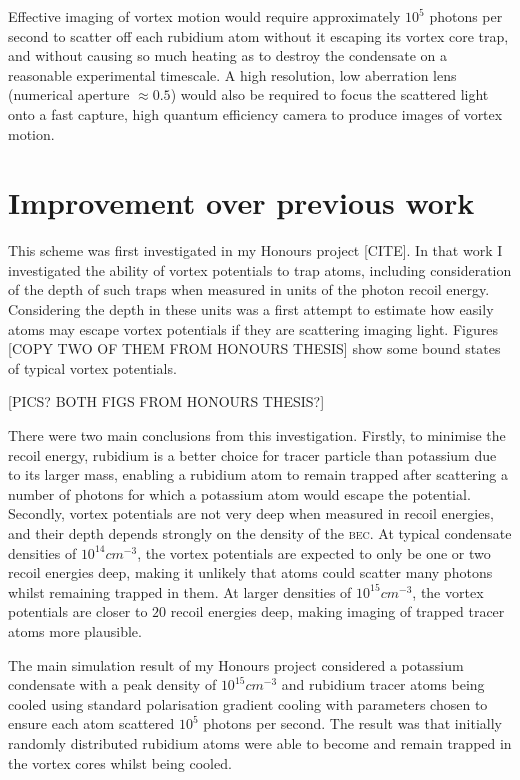 Effective imaging of vortex motion would require approximately $10^5$ photons per second to scatter off each rubidium atom without it escaping its vortex core trap, and without causing so much heating as to destroy the condensate on a reasonable experimental timescale. A high resolution, low aberration lens (numerical aperture $\approx 0.5$) would also be required to focus the scattered light onto a fast capture, high quantum efficiency camera to produce images of vortex motion.


\section{Improvement over previous work}

This scheme was first investigated in my Honours project [CITE]. In that work I investigated the ability of vortex potentials to trap atoms, including consideration of the depth of such traps when measured in units of the photon recoil energy. Considering the depth in these units was a first attempt to estimate how easily atoms may escape vortex potentials if they are scattering imaging light. Figures [COPY TWO OF THEM FROM HONOURS THESIS] show some bound states of typical vortex potentials.

[PICS? BOTH FIGS FROM HONOURS THESIS?]

There were two main conclusions from this investigation. Firstly, to minimise the recoil energy, rubidium is a better choice for tracer particle than potassium due to its larger mass, enabling a rubidium atom to remain trapped after scattering a number of photons for which a potassium atom would escape the potential. Secondly, vortex potentials are not very deep when measured in recoil energies, and their depth depends strongly on the density of the \textsc{bec}. At typical condensate densities of $10^{14}\unit{cm}^{-3}$, the vortex potentials are expected to only be one or two recoil energies deep, making it unlikely that atoms could scatter many photons whilst remaining trapped in them. At larger densities of $10^{15}\unit{cm}^{-3}$, the vortex potentials are closer to $20$ recoil energies deep, making imaging of trapped tracer atoms more plausible.

The main simulation result of my Honours project considered a potassium condensate with a peak density of $10^{15}\unit{cm}^{-3}$ and rubidium tracer atoms being cooled using standard polarisation gradient cooling with parameters chosen to ensure each atom scattered $10^5$ photons per second. The result was that initially randomly distributed rubidium atoms were able to become and remain trapped in the vortex cores whilst being cooled.

